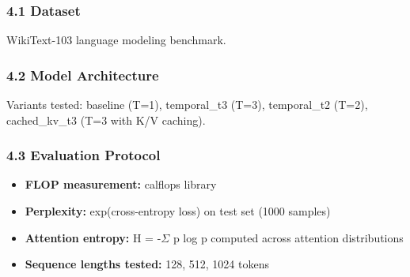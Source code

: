 
\subsubsection{4.1 Dataset}

WikiText-103 language modeling benchmark.

\subsubsection{4.2 Model Architecture}

\begin{table}[htbp]
\centering
{}
\end{table}

Variants tested: baseline (T=1), temporal\_t3 (T=3), temporal\_t2 (T=2), cached\_kv\_t3 (T=3 with K/V caching).

\subsubsection{4.3 Evaluation Protocol}

\begin{itemize}
\item \textbf{FLOP measurement:} calflops library
\item \textbf{Perplexity:} exp(cross-entropy loss) on test set (1000 samples)
\item \textbf{Attention entropy:} H = -$\Sigma$ p log p computed across attention distributions
\item \textbf{Sequence lengths tested:} 128, 512, 1024 tokens
\end{itemize}

